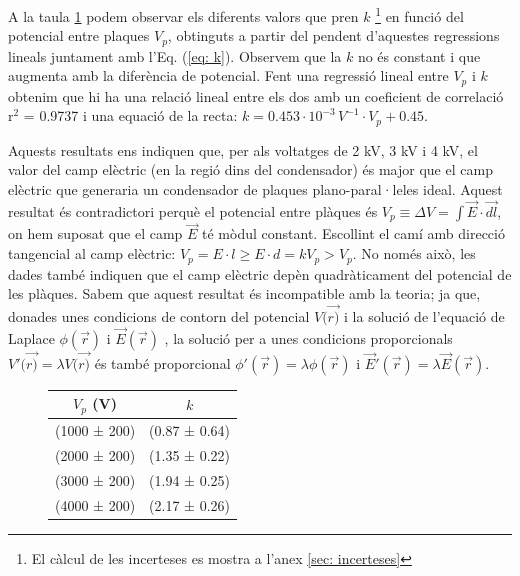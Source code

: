\documentclass[11pt]{article}
\numberwithin{equation}{section}
\numberwithin{figure}{section}
\numberwithin{table}{section}
\begin{document}
A la taula \ref{tab:kvsVp} podem observar els diferents valors que pren $k$ \footnote{El càlcul de les incerteses es mostra a l'anex \ref{sec: incerteses}} en funció del potencial entre plaques $V_p$, obtinguts a partir del pendent d'aquestes regressions lineals juntament amb l'Eq. (\ref{eq: k}). Observem que la $k$ no és constant i que augmenta amb la diferència de potencial. Fent una regressió lineal entre $V_p$ i $k$ obtenim que hi ha una relació lineal entre els dos amb un coeficient de correlació r$^2$ = 0.9737 i una equació de la recta: $k = 0.453 \cdot 10^{-3}\, V^{-1}  \cdot V_p + 0.45$.

Aquests resultats ens indiquen que, per als voltatges de 2 kV, 3 kV i 4 kV, el valor del camp elèctric (en la regió dins del condensador) és major que el camp elèctric que generaria un condensador de plaques plano-paral·leles ideal. Aquest resultat és contradictori perquè el potencial entre plàques és $V_p \equiv \Delta V = \int\vec{E}\cdot\vec{dl}$, on hem suposat que el camp $\vec{E}$ té mòdul constant. Escollint el camí amb direcció tangencial al camp elèctric: $V_p = E \cdot l\ge E\cdot d = kV_p > V_p$. No només això, les dades també indiquen que el camp elèctric depèn quadràticament del potencial de les plàques. Sabem que aquest resultat és incompatible amb la teoria; ja que, donades unes condicions de contorn del potencial $V(\vec{r)}$ i la solució de l'equació de Laplace $\phi(\vec{r})$ i $\vec{E}(\vec{r})$ , la solució per a unes condicions proporcionals $V'(\vec{r)}=\lambda V(\vec{r)}$ és també proporcional $\phi'(\vec{r}) = \lambda \phi(\vec{r})$ i $\vec{E}'(\vec{r}) = \lambda \vec{E}(\vec{r})$.

\begin{figure}[H]
    \centering
    \begin{minipage}{0.45\textwidth} 
        \centering
        \begin{tabular}{|c|c|}
            \hline
            $V_p$ (V)	&	$k$	\\\hline
            (1000 ± 200)	&	(0.87 ± 0.64)   \\\hline
            (2000 ± 200)	&	(1.35 ± 0.22)	\\\hline
            (3000 ± 200)	&	(1.94 ± 0.25)	\\\hline
            (4000 ± 200)	&	(2.17 ± 0.26)	\\\hline           
        \end{tabular}
        \label{tab:kvsVp}
    \end{minipage}
\end{figure}
\end{document}
